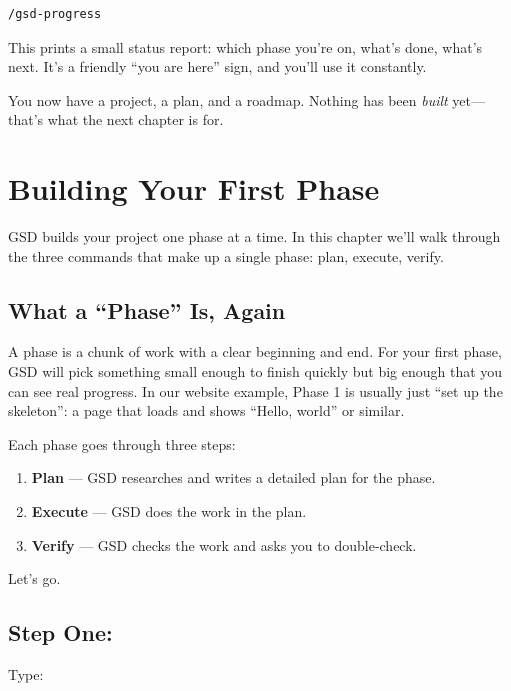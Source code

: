 \documentclass[11pt,letterpaper,openany]{book}
\begin{document}
\begin{lstlisting}
/gsd-progress
\end{lstlisting}

This prints a small status report: which phase you're on, what's done,
what's next. It's a friendly ``you are here'' sign, and you'll use it
constantly.

\bigskip
\noindent You now have a project, a plan, and a roadmap. Nothing has
been \emph{built} yet---that's what the next chapter is for.

\chapter{Building Your First Phase}

GSD builds your project one phase at a time. In this chapter we'll walk
through the three commands that make up a single phase: plan, execute,
verify.

\section{What a ``Phase'' Is, Again}

A phase is a chunk of work with a clear beginning and end. For your
first phase, GSD will pick something small enough to finish quickly but
big enough that you can see real progress. In our website example,
Phase 1 is usually just ``set up the skeleton'': a page that loads and
shows ``Hello, world'' or similar.

Each phase goes through three steps:

\begin{enumerate}
  \item \textbf{Plan} --- GSD researches and writes a detailed plan for
        the phase.
  \item \textbf{Execute} --- GSD does the work in the plan.
  \item \textbf{Verify} --- GSD checks the work and asks you to
        double-check.
\end{enumerate}

Let's go.

\section{Step One: }

Type:
\end{document}
